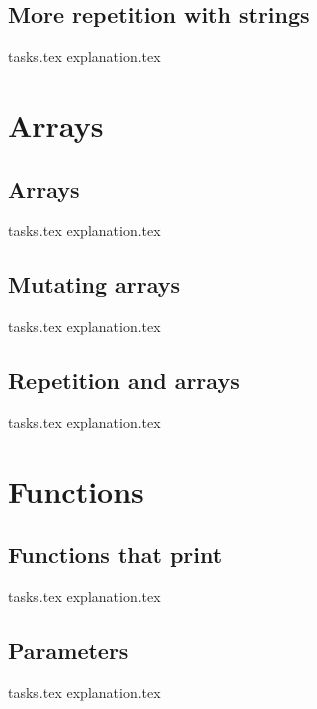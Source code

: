    \section{More repetition with strings}
    {tasks.tex}      \newpage
    {explanation.tex}   \newpage \mbox{} \newpage

    \chapter{Arrays}
    \newpage

    \section{Arrays}
    {tasks.tex}            \newpage
    {explanation.tex}         \newpage

    \section{Mutating arrays}
    {tasks.tex}          \newpage
    {explanation.tex}       \newpage

    \section{Repetition and arrays}
    {tasks.tex}       \newpage
    {explanation.tex}    \newpage

    \chapter{Functions}
    \newpage

    \section{Functions that print}
    {tasks.tex}        \newpage
    {explanation.tex}     \newpage

    \section{Parameters}
    {tasks.tex}       \newpage
    {explanation.tex}    \newpage

